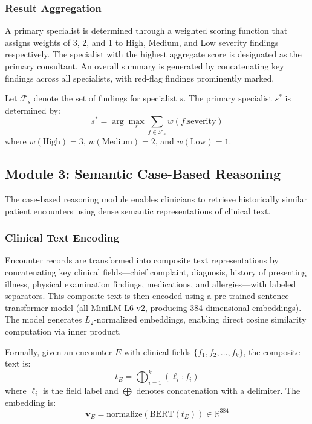 \documentclass[conference]{IEEEtran}
\begin{document}
\subsubsection{Result Aggregation}
A primary specialist is determined through a weighted scoring function that assigns weights of 3, 2, and 1 to High, Medium, and Low severity findings respectively. The specialist with the highest aggregate score is designated as the primary consultant. An overall summary is generated by concatenating key findings across all specialists, with red-flag findings prominently marked.

Let $\mathcal{F}_s$ denote the set of findings for specialist $s$. The primary specialist $s^*$ is determined by:
\begin{equation}
s^* = \arg\max_{s} \sum_{f \in \mathcal{F}_s} w(f.\text{severity})
\label{eq:primary}
\end{equation}
where $w(\text{High})=3$, $w(\text{Medium})=2$, and $w(\text{Low})=1$.

\subsection{Module 3: Semantic Case-Based Reasoning}

The case-based reasoning module enables clinicians to retrieve historically similar patient encounters using dense semantic representations of clinical text.

\subsubsection{Clinical Text Encoding}
Encounter records are transformed into composite text representations by concatenating key clinical fields---chief complaint, diagnosis, history of presenting illness, physical examination findings, medications, and allergies---with labeled separators. This composite text is then encoded using a pre-trained sentence-transformer model (all-MiniLM-L6-v2, producing 384-dimensional embeddings). The model generates $L_2$-normalized embeddings, enabling direct cosine similarity computation via inner product.

Formally, given an encounter $E$ with clinical fields $\{f_1, f_2, \ldots, f_k\}$, the composite text is:
\begin{equation}
t_E = \bigoplus_{i=1}^{k} (\ell_i : f_i)
\label{eq:composite}
\end{equation}
where $\ell_i$ is the field label and $\bigoplus$ denotes concatenation with a delimiter. The embedding is:
\begin{equation}
\mathbf{v}_E = \text{normalize}(\text{BERT}(t_E)) \in \mathbb{R}^{384}
\label{eq:embedding}
\end{equation}
\end{document}
